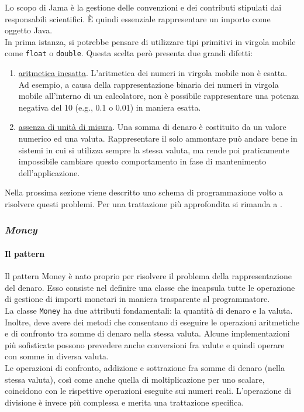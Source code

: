Lo scopo di Jama è la gestione delle convenzioni e dei contributi stipulati dai responsabili scientifici. È quindi essenziale rappresentare un importo come oggetto Java. \\
In prima istanza, si potrebbe pensare di utilizzare tipi primitivi in virgola mobile come \texttt{float} o \texttt{double}. Questa scelta però presenta due grandi difetti:
\begin{enumerate}
\item \underline{aritmetica inesatta}. L'aritmetica dei numeri in virgola mobile non è esatta. Ad esempio, a causa della rappresentazione binaria dei numeri in virgola mobile all'interno di un calcolatore, non è possibile rappresentare una potenza negativa del 10 (e.g., 0.1 o 0.01) in maniera esatta.
\item \underline{assenza di unità di misura}. Una somma di denaro è costituito da un valore numerico ed una valuta. Rappresentare il solo ammontare può andare bene in sistemi in cui si utilizza sempre la stessa valuta, ma rende poi praticamente impossibile cambiare questo comportamento in fase di mantenimento dell'applicazione.
\end{enumerate}

Nella prossima sezione viene descritto uno schema di programmazione volto a risolvere questi problemi. Per una trattazione più approfondita si rimanda a \cite{pa}.

\subsubsection{\textsl{Money}}

\paragraph{Il pattern}
Il pattern Money è nato proprio per risolvere il problema della rappresentazione del denaro. Esso consiste nel definire una classe che incapsula tutte le operazione di gestione di importi monetari in maniera trasparente al programmatore. \\
La classe \lstinline{Money} ha due attributi fondamentali: la quantità di denaro e la valuta. Inoltre, deve avere dei metodi che consentano di eseguire le operazioni aritmetiche e di confronto tra somme di denaro nella stessa valuta. Alcune implementazioni più sofisticate possono prevedere anche conversioni fra valute e quindi operare con somme in diversa valuta.\\
Le operazioni di confronto, addizione e sottrazione fra somme di denaro (nella stessa valuta), così come anche quella di moltiplicazione per uno scalare, coincidono con le rispettive operazioni eseguite sui numeri reali. L'operazione di divisione è invece più complessa e merita una trattazione specifica. 

